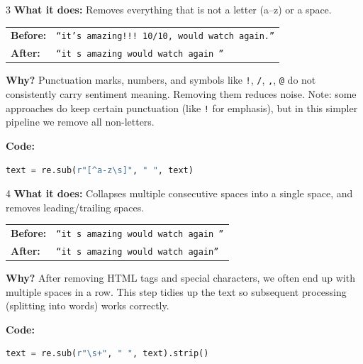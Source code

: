\documentclass[12pt, a4paper]{article}
\begin{document}
\begin{stepbox}{3}
\textbf{What it does:} Removes everything that is not a letter (a--z) or a space.

\medskip
\begin{center}
\begin{tabular}{ll}
\textbf{Before:} & \texttt{``it's amazing!!! 10/10, would watch again.''} \\
\textbf{After:}  & \texttt{``it s amazing      would watch again ''} \\
\end{tabular}
\end{center}

\medskip
\textbf{Why?} Punctuation marks, numbers, and symbols like \texttt{!}, \texttt{/}, \texttt{,}, \texttt{@} do not consistently carry sentiment meaning. Removing them reduces noise. Note: some approaches do keep certain punctuation (like \texttt{!} for emphasis), but in this simpler pipeline we remove all non-letters.

\medskip
\textbf{Code:}
\begin{lstlisting}[language=Python]
text = re.sub(r"[^a-z\s]", " ", text)
\end{lstlisting}
\end{stepbox}

\begin{stepbox}{4}
\textbf{What it does:} Collapses multiple consecutive spaces into a single space, and removes leading/trailing spaces.

\medskip
\begin{center}
\begin{tabular}{ll}
\textbf{Before:} & \texttt{``it s amazing      would   watch again ''} \\
\textbf{After:}  & \texttt{``it s amazing would watch again''} \\
\end{tabular}
\end{center}

\medskip
\textbf{Why?} After removing HTML tags and special characters, we often end up with multiple spaces in a row. This step tidies up the text so subsequent processing (splitting into words) works correctly.

\medskip
\textbf{Code:}
\begin{lstlisting}[language=Python]
text = re.sub(r"\s+", " ", text).strip()
\end{lstlisting}
\end{stepbox}
\end{document}
